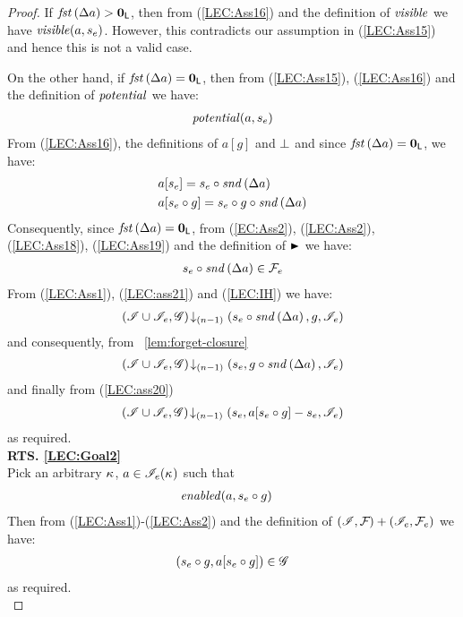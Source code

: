 \begin{lemma}
\begin{proof}
If $\mathit{fst}\left(\Delta {a}\right) > \mathbf{0}_{\textsf{L}}$, then from (\ref{LEC:Ass16}) and the definition of $\mathit{visible}$ we have $\mathit{visible}(a, s_e)$. However, this contradicts our assumption in (\ref{LEC:Ass15}) and hence this is not a valid case.

On the other hand, if $\mathit{fst}\left(\Delta {a}\right) = \mathbf{0}_{\textsf{L}}$, then from (\ref{LEC:Ass15}), (\ref{LEC:Ass16}) and the definition of $\mathit{potential}$ we have:
%
\begin{align}
	\mathit{potential}(a, s_e) \label{LEC:Ass18}
\end{align}
%
From (\ref{LEC:Ass16}), the definitions of $a[g]$ and $\mathrel{\bot}$ and since $\mathit{fst}\left(\Delta {a}\right) = \mathbf{0}_{\textsf{L}}$, we have: 
%
\begin{align}
	& a[s_e] = s_e \circ \mathit{snd}\left(\Delta {a}\right) \label{LEC:Ass19}\\
	& a[s_e \circ g] = s_e \circ g \circ \mathit{snd}\left(\Delta {a}\right) \label{LEC:ass20}
\end{align}
%
Consequently, since $\mathit{fst}\left(\Delta {a}\right) = \mathbf{0}_{\textsf{L}}$, from (\ref{EC:Ass2}), (\ref{LEC:Ass2}), (\ref{LEC:Ass18}), (\ref{LEC:Ass19}) and the definition of $\strictfences$ we have:
%
\begin{align}
	s_e \circ \mathit{snd}\left(\Delta {a}\right) \in \mathcal{F}_{e}  \label{LEC:ass21}
\end{align}
%
From (\ref{LEC:Ass1}), (\ref{LEC:ass21}) and (\ref{LEC:IH}) we have:
%
\begin{align*}
	\left(\mathscr{I} \cup \mathscr{I}_{e}, \mathscr{G}\right) \!\downarrow_{(n-1)} \left(s_e \circ \mathit{snd}\left(\Delta {a}\right), g, \mathscr{I}_e\right)
\end{align*}
%
and consequently, from \lem~\ref{lem:forget-closure}
%
\begin{align*}
	\left(\mathscr{I} \cup \mathscr{I}_{e}, \mathscr{G}\right) \!\downarrow_{(n-1)} \left(s_e, g \circ \mathit{snd}\left(\Delta {a}\right), \mathscr{I}_e\right)
\end{align*}
%
and finally from (\ref{LEC:ass20})
%
\begin{align*}
	\left(\mathscr{I} \cup \mathscr{I}_{e}, \mathscr{G}\right) \!\downarrow_{(n-1)} \left(s_e, a[s_e  \circ g] - s_e, \mathscr{I}_e\right)
\end{align*}
%
as required.\\
%
%
%

\noindent\textbf{RTS. \ref{LEC:Goal2}}\\
Pick an arbitrary $\kappa_{}$, $a \in \mathscr{I}_e(\kappa_{})$ such that
%
\begin{align}
	& \mathit{enabled}(a, s_e \circ g) \label{LEC:Ass20}
\end{align}
Then from (\ref{LEC:Ass1})-(\ref{LEC:Ass2}) and the definition of $(\mathscr{I}, \mathcal{F}_{}) + (\mathscr{I}_e, \mathcal{F}_{e})$ we have:
%
\begin{align*}
	(s_e \circ g, a[s_e \circ g]) \in \mathscr{G}
\end{align*}
%
as required.\\
%
%
%


\end{proof}
\end{lemma}
